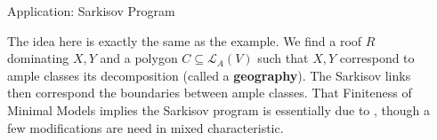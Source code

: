 \documentclass[final]{beamer}
\newlength{\sepwidth}
\newcommand{\separatorcolumn}{\begin{column}{\sepwidth}\end{column}}
\begin{document}
\begin{frame}[t, fragile]
\begin{columns}[t]
\begin{column}{0.44\paperwidth}
\begin{block}{Application: Sarkisov Program}
			\end{block}
			
			The idea here is exactly the same as the example. We find a roof $R$ dominating $X,Y$ and a polygon $C\subseteq \mathcal{L}_{A}(V)$ such that $X,Y$ correspond to ample classes its decomposition (called a \textbf{geography}). The Sarkisov links then correspond the boundaries between ample classes. That Finiteness of Minimal Models implies the Sarkisov program is essentially due to \cite{HMX13}, though a few modifications are need in mixed characteristic.
			
		\end{column}
		
		\separatorcolumn
	\end{columns}
\end{frame}
\end{document}
